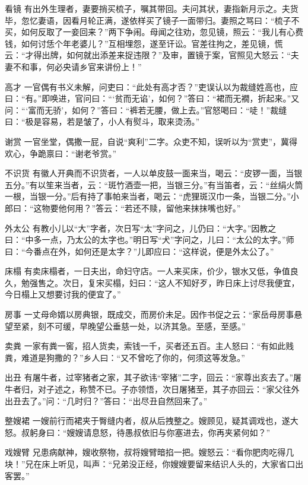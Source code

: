 \documentclass[12pt,UTF8]{ctexbook}
\begin{document}
看镜
有出外生理者，妻要捎买梳子，嘱其带回。夫问其状，妻指新月示之。夫货毕，忽忆妻语，因看月轮正满，遂依样买了镜子一面带归。妻照之骂曰：“梳子不买，如何反取了一妾回来？”两下争闹。母闻之往劝，忽见镜，照云：“我儿有心费钱，如何讨恁个年老婆儿？”互相埋怨，遂至讦讼。官差往拘之，差见镜，慌云：“才得出牌，如何就出添差来捉违限？”及审，置镜于案，官照见大怒云：“夫妻不和事，何必央请乡官来讲份上！”

高才
一官偶有书义未解，问吏曰：“此处有高才否？”吏误认以为裁缝姓高也，应曰：“有。”即唤进，官问曰：“‘贫而无谄’，如何？”答曰：“裙而无襉，折起来。”又问：“‘富而无骄’，如何？”答曰：“裤若无腰，做上去。”官怒喝曰：“唗！”裁缝曰：“极是容易，若是皱了，小人有熨斗，取来烫汤。”

谢赏
一官坐堂，偶撒一屁，自说“爽利”二字。众吏不知，误听以为“赏吏”，冀得欢心，争跪禀曰：“谢老爷赏。”

不识货
有徽人开典而不识货者，一人以单皮鼓一面来当，喝云：“皮锣一面，当银五分。”有以笙来当者，云：“斑竹酒壶一把，当银三分。”有当笛者，云：“丝绢火筒一根，当银一分。”后有持了事帕来当者，喝云：“虎狸斑汉巾一条，当银二分。”小郎曰：“这物要他何用？”答云：“若还不赎，留他来抹抹嘴也好。”

外太公
有教小儿以“大”字者，次日写“太”字问之，儿仍曰：“大字。”因教之曰：“中多一点，乃太公的太字也。”明日写“犬”字问之，儿曰：“太公的太字。”师曰：“今番点在外，如何还是太字？”儿即应曰：“这样说，便是外太公了。”

床榻
有卖床榻者，一日夫出，命妇守店。一人来买床，价少，银水又低，争值良久，勉强售之。次日，复宋买榻，妇曰：“这人不知好歹，昨日床上讨尽我便宜，今日榻上又想要讨我的便宜了。”

房事
一丈母命婿以房典银，既成交，而房价未足。因作书促之云：“家岳母房事悬望至紧，刻不可缓，早晚望公垂慈一处，以济其急。至感，至感。”

卖粪
一家有粪一窖，招人货卖，索钱一千，买者还五百。主人怒曰：“有如此贱粪，难道是狗撒的？”乡人曰：“又不曾吃了你的，何须这等发急。”

出丑
有屠牛者，过宰猪者之家，其子欲讳“宰猪”二字，回云：“家尊出亥去了。”屠牛者归，对子述之，称赞不已。子亦领悟，次日屠猪至，其子亦回云：“家父往外出丑去了。”问：“几时归？”答曰：“出尽丑自然回来了。”

整嫂裙
一嫂前行而裙夹于臀缝内者，叔从后拽整之。嫂顾见，疑其调戏也，遂大怒。叔躬身曰：“嫂嫂请息怒，待愚叔依旧与你塞进去，你再夹紧何如？”

戏嫂臂
兄患病献神，嫂收祭物，叔将嫂臂暗掐一把。嫂怒云：“看你肥肉吃得几块！”兄在床上听见，叫声：“兄弟没正经，你嫂嫂要留来结识人头的，大家省口出客罢。”
\end{document}
